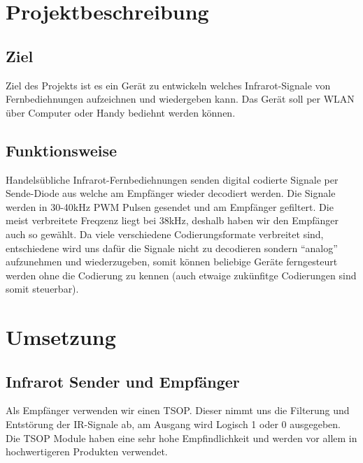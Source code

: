 \documentclass[11pt,a4paper,bibtotoc,oneside]{scrbook}
\begin{document}
\tableofcontents\thispagestyle{empty}
\newpage

\setcounter{page}{1}
\chapter{Projektbeschreibung}

\section{Ziel}
Ziel des Projekts ist es ein Gerät zu entwickeln welches Infrarot-Signale von Fernbediehnungen aufzeichnen und wiedergeben kann.
Das Gerät soll per WLAN über Computer oder Handy bediehnt werden können.

\section{Funktionsweise}
Handelsübliche Infrarot-Fernbediehnungen senden digital codierte Signale per Sende-Diode aus 
welche am Empfänger wieder decodiert werden.
Die Signale werden in 30-40kHz PWM Pulsen gesendet und am Empfänger gefiltert. 
Die meist verbreitete Freqzenz liegt bei 38kHz, deshalb haben wir den Empfänger auch so gewählt. 
Da viele verschiedene Codierungsformate verbreitet sind, entschiedene wird uns dafür die Signale nicht zu 
decodieren sondern ``analog'' aufzunehmen und wiederzugeben, somit können beliebige Geräte ferngesteurt werden 
ohne die Codierung zu kennen (auch etwaige zukünfitge Codierungen sind somit steuerbar).

\chapter{Umsetzung}

\section{Infrarot Sender und Empfänger}
Als Empfänger verwenden wir einen TSOP. Dieser nimmt uns die Filterung und Entstörung der IR-Signale ab,
am Ausgang wird Logisch 1 oder 0 ausgegeben. Die TSOP Module haben eine sehr hohe Empfindlichkeit und werden 
vor allem in hochwertigeren Produkten verwendet.
\end{document}
